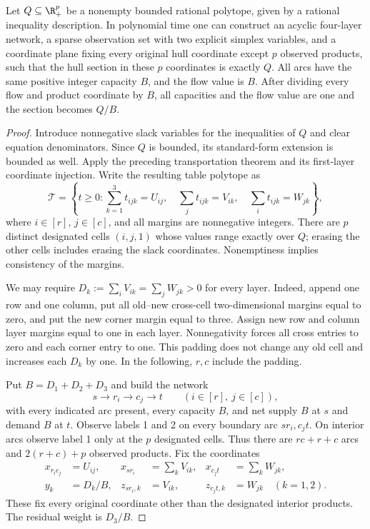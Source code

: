 \begin{theorem}\label{thm:universality}
Let $Q\subseteq\R_+^p$ be a nonempty bounded rational polytope, given by a
rational inequality description. In polynomial time one can construct an
acyclic four-layer network, a sparse observation set with two explicit
simplex variables, and a coordinate plane fixing every original hull
coordinate except $p$ observed products, such that the hull section in
these $p$ coordinates is exactly $Q$. All arcs have the same positive
integer capacity $B$, and the flow value is $B$.
After dividing every flow and product coordinate by $B$, all capacities
and the flow value are one and the section becomes $Q/B$.
\end{theorem}
\begin{proof}
Introduce nonnegative slack variables for the inequalities of $Q$ and
clear equation denominators. Since $Q$ is bounded, its standard-form
extension is bounded as well. Apply the preceding transportation theorem
and its first-layer coordinate injection. Write the resulting table
polytope as
\begin{equation}\label{eq:universal-table}
 \mathcal T=\left\{t\ge0:
 \sum_{k=1}^3t_{ijk}=U_{ij},\quad
 \sum_jt_{ijk}=V_{ik},\quad
 \sum_it_{ijk}=W_{jk}\right\},
\end{equation}
where $i\in[r]$, $j\in[c]$, and all margins are nonnegative integers.
There are $p$ distinct designated cells $(i,j,1)$ whose values range
exactly over $Q$; erasing the other cells includes erasing the slack
coordinates. Nonemptiness implies consistency of the margins.

We may require $D_k:=\sum_iV_{ik}=\sum_jW_{jk}>0$ for every layer.
Indeed, append one row and one column, put all old--new cross-cell
two-dimensional margins equal to zero, and put the new corner margin
equal to three. Assign new row and column layer margins equal to one
in each layer. Nonnegativity forces all cross entries to zero and each
corner entry to one. This padding does not change any old cell and
increases each $D_k$ by one. In the following, $r,c$ include the padding.

Put $B=D_1+D_2+D_3$ and build the network
\[
 s\longrightarrow r_i\longrightarrow c_j\longrightarrow t
 \qquad(i\in[r],\ j\in[c]),
\]
with every indicated arc present, every capacity $B$, and net supply
$B$ at $s$ and demand $B$ at $t$. Observe labels 1 and 2 on every
boundary arc $sr_i,c_jt$. On interior arcs observe label 1 only at
the $p$ designated cells. Thus there are $rc+r+c$ arcs and
$2(r+c)+p$ observed products. Fix the coordinates
\begin{align*}
 x_{r_ic_j}&=U_{ij},&
 x_{sr_i}&=\sum_kV_{ik},&x_{c_jt}&=\sum_kW_{jk},\\
 y_k&=D_k/B,&
 z_{sr_i,k}&=V_{ik},&z_{c_jt,k}&=W_{jk}\quad(k=1,2).
\end{align*}
These fix every original coordinate other than the designated interior
products. The residual weight is $D_3/B$.


\end{proof}
